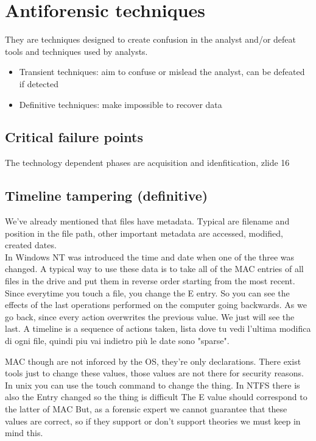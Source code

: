 \section{Antiforensic techniques}
    They are techniques designed to create confusion in the analyst and/or defeat tools and techniques used by analysts.
    \begin{itemize}
        \item Transient techniques: aim to confuse or mislead the analyst, can be defeated if detected
        \item Definitive techniques: make impossible to recover data
    \end{itemize}
    \subsection{Critical failure points}
        The technology dependent phases are acquisition and idenfitication, 
        zlide 16
    \subsection{Timeline tampering (definitive)}
        We've already mentioned that files have metadata. Typical are filename and position in the file path, other important metadata are accessed, modified, created dates.\\
        In Windows NT was introduced the time and date when one of the three was changed.
        A typical way to use these data is to take all of the MAC entries of all files in the drive and put them in reverse order starting from the most recent.
        Since everytime you touch a file, you change the E entry. So you can see the effects of the last operations performed on the computer going backwards.
        As we go back, since every action overwrites the previous value. We just will see the last. A timeline is a sequence of actions taken,
        lista dove tu vedi l'ultima modifica di ogni file, quindi piu vai indietro più le date sono "sparse".

        MAC though are not inforced by the OS, they're only declarations. There exist tools just to change these values, those values are not there for security reasons.
        In unix you can use the touch command to change the thing.
        In NTFS there is also the Entry changed so the thing is difficult
        The E value should correspond to the latter of MAC 
        But, as a forensic expert we cannot guarantee that these values are correct, so if they support or don't support theories we must keep in mind this.


